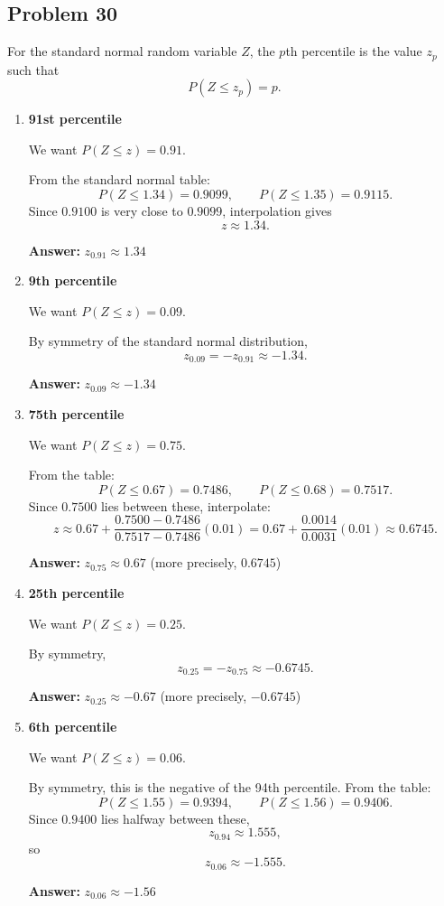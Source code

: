 \documentclass[11pt]{article}
\begin{document}
\subsection*{Problem 30}

For the standard normal random variable $Z$, the $p$th percentile is the value $z_p$ such that
\[
P(Z \le z_p)=p.
\]

\begin{enumerate}
    \item[(a)] \textbf{91st percentile}

    We want $P(Z \le z)=0.91$.

    From the standard normal table:
    \[
    P(Z\le 1.34)=0.9099,\qquad P(Z\le 1.35)=0.9115.
    \]
    Since $0.9100$ is very close to $0.9099$, interpolation gives
    \[
    z \approx 1.34.
    \]

    \textbf{Answer:} $z_{0.91}\approx 1.34$

    \item[(b)] \textbf{9th percentile}

    We want $P(Z \le z)=0.09$.

    By symmetry of the standard normal distribution,
    \[
    z_{0.09}=-z_{0.91}\approx -1.34.
    \]

    \textbf{Answer:} $z_{0.09}\approx -1.34$

    \item[(c)] \textbf{75th percentile}

    We want $P(Z \le z)=0.75$.

    From the table:
    \[
    P(Z\le 0.67)=0.7486,\qquad P(Z\le 0.68)=0.7517.
    \]
    Since $0.7500$ lies between these, interpolate:
    \[
    z \approx 0.67+\frac{0.7500-0.7486}{0.7517-0.7486}(0.01)
    =0.67+\frac{0.0014}{0.0031}(0.01)
    \approx 0.6745.
    \]

    \textbf{Answer:} $z_{0.75}\approx 0.67$ (more precisely, $0.6745$)

    \item[(d)] \textbf{25th percentile}

    We want $P(Z \le z)=0.25$.

    By symmetry,
    \[
    z_{0.25}=-z_{0.75}\approx -0.6745.
    \]

    \textbf{Answer:} $z_{0.25}\approx -0.67$ (more precisely, $-0.6745$)

    \item[(e)] \textbf{6th percentile}

    We want $P(Z \le z)=0.06$.

    By symmetry, this is the negative of the 94th percentile. From the table:
    \[
    P(Z\le 1.55)=0.9394,\qquad P(Z\le 1.56)=0.9406.
    \]
    Since $0.9400$ lies halfway between these,
    \[
    z_{0.94}\approx 1.555,
    \]
    so
    \[
    z_{0.06}\approx -1.555.
    \]

    \textbf{Answer:} $z_{0.06}\approx -1.56$
\end{enumerate}
\end{document}
